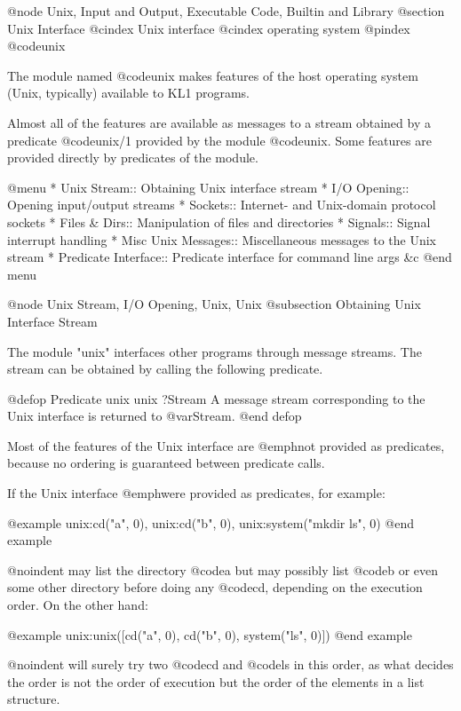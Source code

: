 {{{{@node Unix, Input and Output, Executable Code, Builtin and Library
@section Unix Interface
@cindex Unix interface
@cindex operating system
@pindex @code{unix}

The module named @code{unix} makes features of the host operating system
(Unix, typically) available to KL1 programs.

Almost all of the features are available as messages to a stream obtained
by a predicate @code{unix/1} provided by the module @code{unix}.  Some
features are provided directly by predicates of the module.

@menu
* Unix Stream::                 Obtaining Unix interface stream
* I/O Opening::                 Opening input/output streams
* Sockets::                     Internet- and Unix-domain protocol sockets
* Files & Dirs::                Manipulation of files and directories
* Signals::                     Signal interrupt handling
* Misc Unix Messages::          Miscellaneous messages to the Unix stream
* Predicate Interface::         Predicate interface for command line args &c
@end menu

@node Unix Stream, I/O Opening, Unix, Unix
@subsection Obtaining Unix Interface Stream

The module "unix" interfaces other programs through message streams.
The stream can be obtained by calling the following predicate.

@defop {Predicate} {unix} unix ?Stream
A message stream corresponding to the Unix interface is returned to
@var{Stream}.
@end defop

Most of the features of the Unix interface are @emph{not} provided as
predicates, because no ordering is guaranteed between predicate calls.

If the Unix interface @emph{were} provided as predicates, for example:

@example
unix:cd("a", 0),
unix:cd("b", 0),
unix:system("mkdir ls", 0)
@end example

@noindent
may list the directory @code{a} but may possibly list @code{b} or even
some other directory before doing any @code{cd}, depending on the
execution order.  On the other hand:

@example
unix:unix([cd("a", 0),
           cd("b", 0),
           system("ls", 0)])
@end example

@noindent
will surely try two @code{cd} and @code{ls} in this order, as what
decides the order is not the order of execution but the order of the
elements in a list structure.

}}}}
